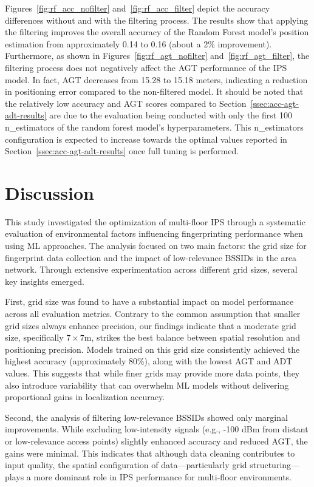 \documentclass[runningheads]{llncs}
\begin{document}
Figures~\ref{fig:rf_acc_nofilter} and~\ref{fig:rf_acc_filter} depict the accuracy differences without and with the filtering process. The results show that applying the filtering improves the overall accuracy of the Random Forest model's position estimation from approximately 0.14 to 0.16 (about a 2\% improvement). Furthermore, as shown in Figures~\ref{fig:rf_agt_nofilter} and~\ref{fig:rf_agt_filter}, the filtering process does not negatively affect the AGT performance of the IPS model. In fact, AGT decreases from 15.28 to 15.18 meters, indicating a reduction in positioning error compared to the non-filtered model. It should be noted that the relatively low accuracy and AGT scores compared to Section~\ref{ssec:acc-agt-adt-results} are due to the evaluation being conducted with only the first 100 n\_estimators of the random forest model's hyperparameters. This n\_estimators configuration is expected to increase towards the optimal values reported in Section~\ref{ssec:acc-agt-adt-results} once full tuning is performed.

\section{Discussion}\label{sec:discussion}

This study investigated the optimization of multi-floor IPS through a systematic evaluation of environmental factors influencing fingerprinting performance when using ML approaches. The analysis focused on two main factors: the grid size for fingerprint data collection and the impact of low-relevance BSSIDs in the area network. Through extensive experimentation across different grid sizes, several key insights emerged.

First, grid size was found to have a substantial impact on model performance across all evaluation metrics. Contrary to the common assumption that smaller grid sizes always enhance precision, our findings indicate that a moderate grid size, specifically $7\times7$m, strikes the best balance between spatial resolution and positioning precision. Models trained on this grid size consistently achieved the highest accuracy (approximately 80\%), along with the lowest AGT and ADT values. This suggests that while finer grids may provide more data points, they also introduce variability that can overwhelm ML models without delivering proportional gains in localization accuracy.

Second, the analysis of filtering low-relevance BSSIDs showed only marginal improvements. While excluding low-intensity signals (e.g., -100 dBm from distant or low-relevance access points) slightly enhanced accuracy and reduced AGT, the gains were minimal. This indicates that although data cleaning contributes to input quality, the spatial configuration of data—particularly grid structuring—plays a more dominant role in IPS performance for multi-floor environments.
\end{document}
